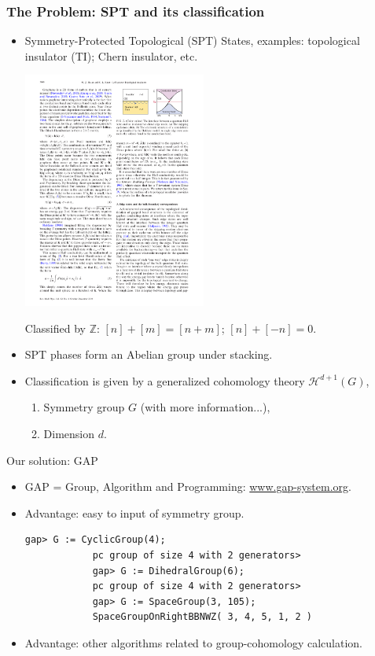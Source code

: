 \documentclass[xcolor=table, aspectratio=169]{beamer}
\begin{document}
\begin{frame}
	\frametitle{The Problem: SPT and its classification}
	\begin{itemize}
		\item Symmetry-Protected Topological (SPT) States, examples: topological insulator (TI); Chern insulator, etc.
		\begin{center}
			\includegraphics[width=6cm]{../spspt/qhe_edge}
		\end{center}
		{\small Classified by $\mathbb Z$: $[n]+[m]=[n+m]$; $[n]+[-n] = 0$.}	  
		\item SPT phases form an Abelian group under stacking.
		\item Classification is given by a generalized cohomology theory $\mathcal H^{d+1}(G)$,
		\begin{enumerate}
			\item Symmetry group $G$ (with more information...),
			\item Dimension $d$.
		\end{enumerate}
	\end{itemize}
\end{frame}

\begin{frame}[fragile]{Our solution: GAP}
	\begin{itemize}
		\item GAP = Group, Algorithm and Programming: \url{www.gap-system.org}.
		\item Advantage: easy to input of symmetry group.
		\begin{lstlisting}[basicstyle=\footnotesize]
			gap> G := CyclicGroup(4);
			pc group of size 4 with 2 generators>
			gap> G := DihedralGroup(6);
			pc group of size 4 with 2 generators>
			gap> G := SpaceGroup(3, 105);
			SpaceGroupOnRightBBNWZ( 3, 4, 5, 1, 2 )
		\end{lstlisting}
		\item Advantage: other algorithms related to group-cohomology calculation.			
	\end{itemize}
\end{frame}
\end{document}
